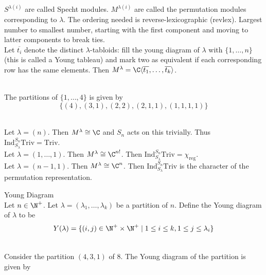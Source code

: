 \documentclass[a4paper]{article}
\begin{document}
$S^{\lambda(i)}$ are called Specht modules. $M^{\lambda(i)}$ are called the permutation modules corresponding to $\lambda$. The ordering needed is reverse-lexicographic (revlex). Largest number to smallest number, starting with the first component and moving to latter components to break ties. \\

Let $\overline{t_i}$ denote the distinct $\lambda$-tabloids: fill the young diagram of $\lambda$ with $\{1,\dots,n\}$ (this is called a Young tableau) and mark two as equivalent if each corresponding row has the same elements. Then $M^\lambda=\C\langle\overline{t_1},\dots,\overline{t_k}\rangle$. 

\begin{eg}{}{}\\
The partitions of $\{1,\dots,4\}$ is given by $$\{(4),(3,1),(2,2),(2,1,1),(1,1,1,1)\}$$ 
\end{eg}

\begin{eg}{}{}\\
Let $\lambda=(n)$. Then $M^\lambda\cong\C$ and $S_n$ acts on this trivially. Thus $\text{Ind}_{S_\lambda}^{S_n}\text{Triv}=\text{Triv}$. \\

Let $\lambda=(1,\dots,1)$. Then $M^\lambda\cong\C^{n!}$. Then $\text{Ind}_{S_\lambda}^{S_n}\text{Triv}=\chi_\text{reg}$. \\

Let $\lambda=(n-1,1)$. Then $M^\lambda\cong\C^n$. Then $\text{Ind}_{S_\lambda}^{S_n}\text{Triv}$ is the character of the permutation representation. 
\end{eg}

\begin{defn}{Young Diagram}{}\\
Let $n\in\N^+$. Let $\lambda=(\lambda_1,\dots,\lambda_k)$ be a partition of $n$. Define the Young diagram of $\lambda$ to be $$Y(\lambda)=\{(i,j)\in\N^+\times\N^+\;|\;1\leq i\leq k,1\leq j\leq\lambda_i\}$$
\end{defn}

\begin{eg}{}{}\\
Consider the partition $(4,3,1)$ of $8$. The Young diagram of the partition is given by \\
\begin{center}
\end{center}
\end{eg}
\end{document}
